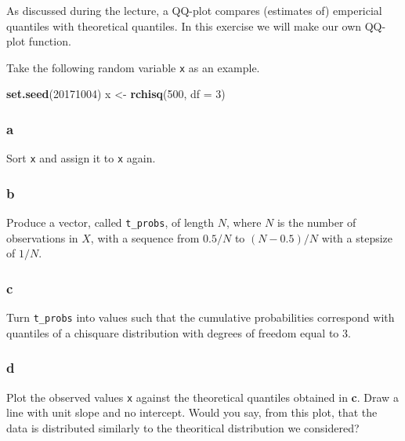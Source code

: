 \documentclass[]{article}
\newenvironment{Shaded}{\begin{snugshade}}{\end{snugshade}}
\newcommand{\DataTypeTok}[1]{\textcolor[rgb]{0.13,0.29,0.53}{#1}}
\newcommand{\DecValTok}[1]{\textcolor[rgb]{0.00,0.00,0.81}{#1}}
\newcommand{\KeywordTok}[1]{\textcolor[rgb]{0.13,0.29,0.53}{\textbf{#1}}}
\newcommand{\NormalTok}[1]{#1}
\newcommand{\StringTok}[1]{\textcolor[rgb]{0.31,0.60,0.02}{#1}}
\begin{document}
As discussed during the lecture, a QQ-plot compares (estimates of)
empericial quantiles with theoretical quantiles. In this exercise we
will make our own QQ-plot function.

Take the following random variable \texttt{x} as an example.

\begin{Shaded}
\begin{Highlighting}[]
\KeywordTok{set.seed}\NormalTok{(}\DecValTok{20171004}\NormalTok{)}
\NormalTok{x <-}\StringTok{ }\KeywordTok{rchisq}\NormalTok{(}\DecValTok{500}\NormalTok{, }\DataTypeTok{df =} \DecValTok{3}\NormalTok{)}
\end{Highlighting}
\end{Shaded}

\hypertarget{a-5}{%
\subsubsection{a}\label{a-5}}

Sort \texttt{x} and assign it to \texttt{x} again.

\hypertarget{b-5}{%
\subsubsection{b}\label{b-5}}

Produce a vector, called \texttt{t\_probs}, of length \(N\), where \(N\)
is the number of observations in \(X\), with a sequence from \(0.5/N\)
to \((N-0.5)/N\) with a stepsize of \(1/N\).

\hypertarget{c-6}{%
\subsubsection{c}\label{c-6}}

Turn \texttt{t\_probs} into values such that the cumulative
probabilities correspond with quantiles of a chisquare distribution with
degrees of freedom equal to \(3\).

\hypertarget{d-5}{%
\subsubsection{d}\label{d-5}}

Plot the observed values \texttt{x} against the theoretical quantiles
obtained in \textbf{c}. Draw a line with unit slope and no intercept.
Would you say, from this plot, that the data is distributed similarly to
the theoritical distribution we considered?
\end{document}
